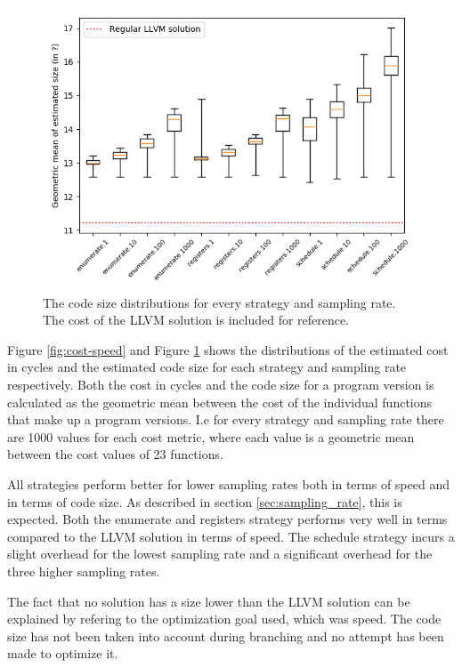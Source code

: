 \begin{figure}[h]
	\centering
	\includegraphics[width=\textwidth,height=0.5\textheight]{results/figures/cost_size}
	\caption{The code size distributions for every strategy and sampling rate. The cost of the LLVM solution is included for reference.}
	\label{fig:cost-size}
\end{figure}

Figure \ref{fig:cost-speed} and Figure \ref{fig:cost-size} shows the distributions of the
estimated cost in cycles and the estimated code size for each strategy and sampling rate
respectively. Both the cost in cycles and the code size for a program version is
calculated as the geometric mean between the cost of the individual functions that make
up a program versions. I.e for every strategy and sampling rate there are 1000 values for
each cost metric, where each value is a geometric mean between the cost values of 23
functions.

All strategies perform better for lower sampling rates both in terms of speed and in terms
of code size. As described in section \ref{sec:sampling_rate}, this is expected. Both the
enumerate and registers strategy performs very well in terms compared to the LLVM solution
in terms of speed. The schedule strategy incurs a slight overhead for the lowest sampling
rate and a significant overhead for the three higher sampling rates.

The fact that no solution has a size lower than the LLVM solution can be explained by
refering to the optimization goal used, which was speed. The code size has not been taken
into account during branching and no attempt has been made to optimize it.

